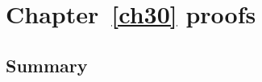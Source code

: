 \chapter{Chapter~\ref{ch30} proofs}

\newpage
\section{Summary}\label{ch30.ps.summary}
\lpscriptsummary
